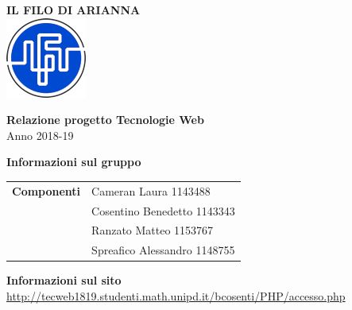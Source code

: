 \begin{center}
	\textbf{\Huge{IL FILO DI ARIANNA}}\\
	\vspace{15pt}
	\includegraphics{../img/logo.png}
\end{center}

\vspace{1.5cm}

\begin{center}
	\textbf{\huge{Relazione progetto Tecnologie Web}}\\[0.2cm]
	\Large{Anno 2018-19}
\end{center}

\vspace{5pt}

\begin{center}
	\textbf{\Large{Informazioni sul gruppo}}
\begin{table}[H]
	\hspace{3.5cm}
	\renewcommand{\arraystretch}{1.4}
	\begin{tabular}{l | l}
		\textbf{Componenti} & Cameran Laura 1143488\\
		& Cosentino Benedetto 1143343\\
		& Ranzato Matteo 1153767\\
		& Spreafico Alessandro 1148755\\
	\end{tabular}
\end{table}
\end{center}

\hspace{5pt}

\begin{center}
	\textbf{\Large{Informazioni sul sito}}\\
	\url{http://tecweb1819.studenti.math.unipd.it/bcosenti/PHP/accesso.php}
\end{center}